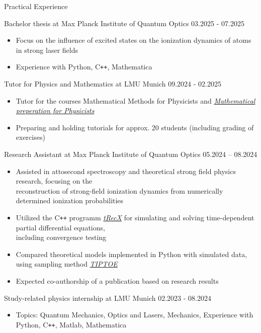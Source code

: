 \documentclass{resume}
\begin{document}
\begin{rSection}{Practical Experience}

    Bachelor thesis at Max Planck Institute of Quantum Optics \hfill 03.2025 - 07.2025
    \begin{itemize}\footnotesize
        \item Focus on the influence of excited states on the ionization dynamics of atoms in strong laser fields
        \item Experience with Python, C\texttt{++}, Mathematica
    \end{itemize}

    Tutor for Physics and Mathematics at LMU Munich \hfill 09.2024 - 02.2025
    \begin{itemize}\footnotesize
        \item Tutor for the courses Mathematical Methods for Physicists and \textit{\href{https://www.physik.lmu.de/de/studium/zusatzangebote/mathe-crashkurs/}{Mathematical preperation for Physicists}}
        \item Preparing and holding tutorials for approx. 20 students (including grading of exercises)
    \end{itemize}

    Research Assistant at Max Planck Institute of Quantum Optics \hfill 05.2024 – 08.2024
    \begin{itemize}\footnotesize
        \item Assisted in attosecond spectroscopy and theoretical strong field physics research, focusing on the\\reconstruction of strong-field ionization dynamics from numerically determined ionization probabilities
        \item Utilized the C\texttt{++} programm \textit{\href{https://gitlab.physik.uni-muenchen.de/AG-Scrinzi/tRecX}{tRecX}} for simulating and solving time-dependent partial differential equations,\\including convergence testing
        \item Compared theoretical models implemented in Python with simulated data, using sampling method \textit{\href{https://doi.org/10.1364/OPTICA.5.000402}{TIPTOE}}
        \item Expected co-authorship of a publication based on research results
    \end{itemize}

    Study-related physics internship at LMU Munich \hfill 02.2023 - 08.2024
    \begin{itemize}\footnotesize
        \item Topics: Quantum Mechanics, Optics and Lasers, Mechanics, Experience with Python, C\texttt{++}, Matlab, Mathematica
    \end{itemize}

\end{rSection}
\end{document}
